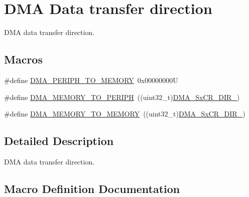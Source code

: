 \hypertarget{group___d_m_a___data__transfer__direction}{}\section{D\+MA Data transfer direction}
\label{group___d_m_a___data__transfer__direction}


D\+MA data transfer direction.  


\subsection*{Macros}
\begin{DoxyCompactItemize}
\item 
\#define \hyperlink{group___d_m_a___data__transfer__direction_gacb2cbf03ecae6804ae4a6f60a3e37c12}{D\+M\+A\+\_\+\+P\+E\+R\+I\+P\+H\+\_\+\+T\+O\+\_\+\+M\+E\+M\+O\+RY}~0x00000000U
\item 
\#define \hyperlink{group___d_m_a___data__transfer__direction_ga9e76fc559a2d5c766c969e6e921b1ee9}{D\+M\+A\+\_\+\+M\+E\+M\+O\+R\+Y\+\_\+\+T\+O\+\_\+\+P\+E\+R\+I\+PH}~((uint32\+\_\+t)\hyperlink{group___peripheral___registers___bits___definition_gadca9547536f3d2f76577275964b4875e}{D\+M\+A\+\_\+\+Sx\+C\+R\+\_\+\+D\+I\+R\+\_})
\item 
\#define \hyperlink{group___d_m_a___data__transfer__direction_ga0695035d725855ccf64d2d8452a33810}{D\+M\+A\+\_\+\+M\+E\+M\+O\+R\+Y\+\_\+\+T\+O\+\_\+\+M\+E\+M\+O\+RY}~((uint32\+\_\+t)\hyperlink{group___peripheral___registers___bits___definition_gac52c8d6ecad03bfe531867fa7457f2ae}{D\+M\+A\+\_\+\+Sx\+C\+R\+\_\+\+D\+I\+R\+\_})
\end{DoxyCompactItemize}


\subsection{Detailed Description}
D\+MA data transfer direction. 



\subsection{Macro Definition Documentation}
\mbox{\label{group___d_m_a___data__transfer__direction_ga0695035d725855ccf64d2d8452a33810}} 
